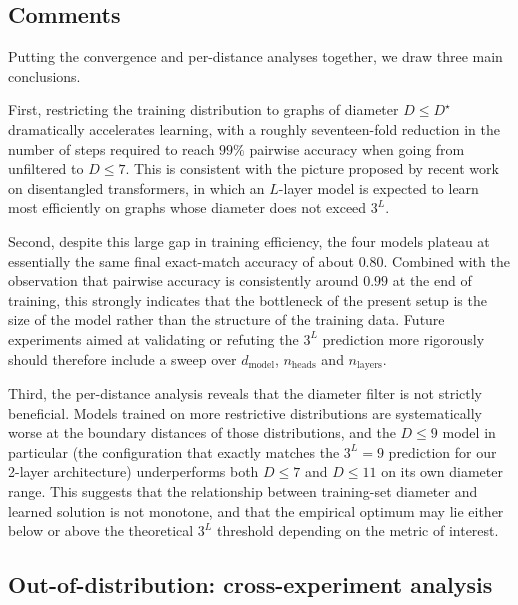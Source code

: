 \documentclass[11pt,a4paper]{article}
\begin{document}
\subsection{Comments}

Putting the convergence and per-distance analyses together, we draw three main conclusions.

First, restricting the training distribution to graphs of diameter \(D \le D^\star\) dramatically accelerates learning, 
with a roughly seventeen-fold reduction in the number of steps required to reach \(99\%\) pairwise accuracy when going 
from unfiltered to \(D \le 7\). This is consistent with the picture proposed by recent work on disentangled transformers, 
in which an \(L\)-layer model is expected to learn most efficiently on graphs whose diameter does not exceed \(3^L\).

Second, despite this large gap in training efficiency, the four models plateau at essentially the same final exact-match 
accuracy of about \(0.80\). Combined with the observation that pairwise accuracy is consistently around \(0.99\) at the 
end of training, this strongly indicates that the bottleneck of the present setup is the size of the model rather than 
the structure of the training data. Future experiments aimed at validating or refuting the \(3^L\) prediction more 
rigorously should therefore include a sweep over \(d_{\mathrm{model}}\), \(n_{\mathrm{heads}}\) and \(n_{\mathrm{layers}}\).

Third, the per-distance analysis reveals that the diameter filter is not strictly beneficial. Models trained on more 
restrictive distributions are systematically worse at the boundary distances of those distributions, and the \(D \le 9\) 
model in particular (the configuration that exactly matches the \(3^L = 9\) prediction for our 2-layer architecture) 
underperforms both \(D \le 7\) and \(D \le 11\) on its own diameter range. This suggests that the relationship between 
training-set diameter and learned solution is not monotone, and that the empirical optimum may lie either below or above 
the theoretical \(3^L\) threshold depending on the metric of interest.

\subsection{Out-of-distribution: cross-experiment analysis}
\end{document}

